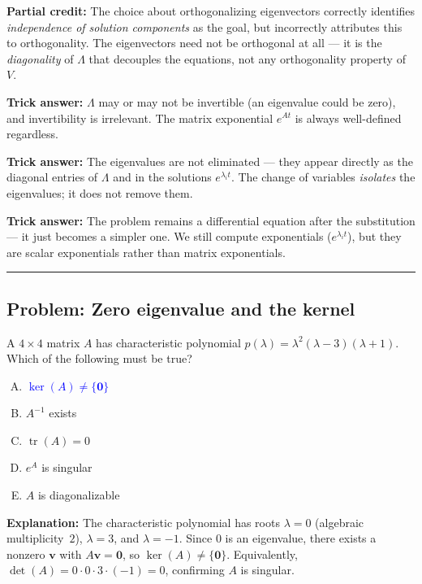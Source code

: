 \documentclass[12pt]{amsart}
\newcommand{\divider}{
  \vspace{-1em}
  \noindent
  \raisebox{-0.15ex}{\textbullet}%
  \hspace{0.5em}%
  \rule[0.5ex]{0.95\textwidth}{1.0pt}%
  \hspace{0.5em}%
  \raisebox{-0.15ex}{\textbullet}%
  \vspace{0em}
}
\begin{document}
\textbf{Partial credit:}
The choice about orthogonalizing eigenvectors correctly identifies
\emph{independence of solution components} as the goal, but incorrectly
attributes this to orthogonality. The eigenvectors need not be orthogonal
at all --- it is the \emph{diagonality} of $\Lambda$ that decouples the
equations, not any orthogonality property of $V$.

\textbf{Trick answer:}
$\Lambda$ may or may not be invertible (an eigenvalue could be zero),
and invertibility is irrelevant. The matrix exponential $e^{At}$ is always
well-defined regardless.

\textbf{Trick answer:}
The eigenvalues are not eliminated --- they appear directly as the
diagonal entries of $\Lambda$ and in the solutions $e^{\lambda_i t}$.
The change of variables \emph{isolates} the eigenvalues; it does not
remove them.

\textbf{Trick answer:}
The problem remains a differential equation after the substitution ---
it just becomes a simpler one. We still compute exponentials
($e^{\lambda_i t}$), but they are scalar exponentials rather than
matrix exponentials.

\divider

\subsection*{Problem: Zero eigenvalue and the kernel}

A $4 \times 4$ matrix $A$ has characteristic polynomial
$p(\lambda) = \lambda^2(\lambda - 3)(\lambda + 1)$.
Which of the following must be true?

\begin{enumerate}[(A)]
\item \textcolor{blue}{\textbf{$\ker(A) \neq \{\mathbf{0}\}$}}
\item $A^{-1}$ exists
\item $\operatorname{tr}(A) = 0$
\item $e^{A}$ is singular
\item $A$ is diagonalizable
\end{enumerate}

\textbf{Explanation:}
The characteristic polynomial has roots $\lambda = 0$ (algebraic
multiplicity~$2$), $\lambda = 3$, and $\lambda = -1$. Since $0$ is an
eigenvalue, there exists a nonzero $\mathbf{v}$ with
$A\mathbf{v} = \mathbf{0}$, so $\ker(A) \neq \{\mathbf{0}\}$.
Equivalently, $\det(A) = 0 \cdot 0 \cdot 3 \cdot (-1) = 0$, confirming
$A$ is singular.
\end{document}

